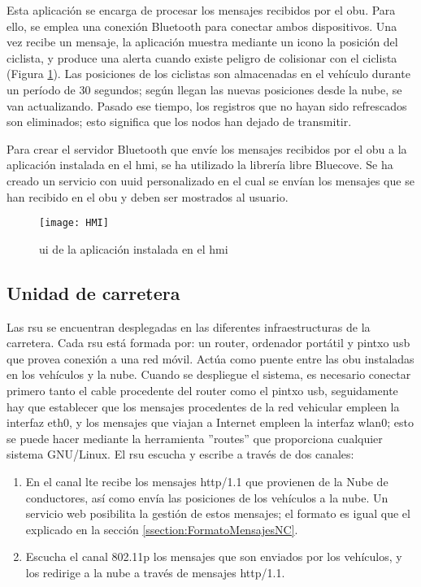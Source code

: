Esta aplicación se encarga de procesar los mensajes recibidos por el \gls{obu}.
Para ello, se emplea una conexión Bluetooth para conectar ambos dispositivos.
Una vez recibe un mensaje, la aplicación muestra mediante un icono la posición
del ciclista, y produce una alerta cuando existe peligro de colisionar con el
ciclista (Figura \ref{fig:HMI}). Las posiciones de los ciclistas son
almacenadas en el vehículo durante un período de 30 segundos; según llegan las
nuevas posiciones desde la nube, se van actualizando. Pasado ese tiempo, los
registros que no hayan sido refrescados son eliminados; esto significa que los
nodos han dejado de transmitir.

Para crear el servidor Bluetooth que envíe los mensajes recibidos por el
\gls{obu} a la aplicación instalada en el \gls{hmi}, se ha utilizado la
librería libre Bluecove. Se ha creado un servicio con \gls{uuid} personalizado
en el cual se envían los mensajes que se han recibido en el \gls{obu} y deben
ser mostrados al usuario.

\begin{figure}[H]
	\begin{center}
		\texttt{[image: HMI]}
		\caption{\gls{ui} de la aplicación instalada en el \gls{hmi}}
		\label{fig:HMI}
	\end{center}
\end{figure}

\subsection{Unidad de carretera}
Las \gls{rsu} se encuentran desplegadas en las diferentes infraestructuras de
la carretera. Cada \gls{rsu} está formada por: un router, ordenador portátil
y pintxo \gls{usb} que provea conexión a una red móvil. Actúa como puente
entre las \gls{obu} instaladas en los vehículos y la nube. Cuando se despliegue
el sistema, es necesario conectar primero tanto el cable procedente del router
como el pintxo \gls{usb}, seguidamente hay que establecer que los mensajes
procedentes de la red vehicular empleen la interfaz eth0, y los mensajes que
viajan a Internet empleen la interfaz wlan0; esto se puede hacer mediante la
herramienta ''routes'' que proporciona cualquier sistema GNU/Linux. El
\gls{rsu} escucha y escribe a través de dos canales:
\begin{enumerate}
	\item En el canal \gls{lte} recibe los mensajes \Gls{http/1.1} que provienen
	de la Nube de conductores, así como envía las posiciones de los vehículos a
	la nube. Un 	servicio web posibilita la gestión de estos mensajes; el
	formato es igual que el	explicado en la sección \ref{ssection:FormatoMensajesNC}.

	\item Escucha el canal \Gls{802.11p} los mensajes que son enviados por
	los vehículos, y los redirige a la nube a través de mensajes \Gls{http/1.1}.
\end{enumerate}

